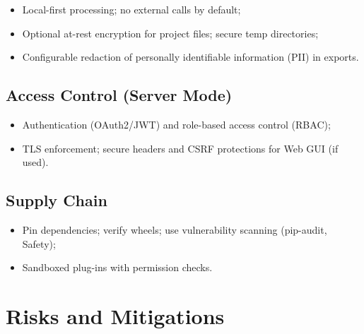 \begin{itemize}
    \item Local-first processing; no external calls by default;
    \item Optional at-rest encryption for project files; secure temp directories;
    \item Configurable redaction of personally identifiable information (PII) in exports.
\end{itemize}

\subsection{Access Control (Server Mode)}

\begin{itemize}
    \item Authentication (OAuth2/JWT) and role-based access control (RBAC);
    \item TLS enforcement; secure headers and CSRF protections for Web GUI (if used).
\end{itemize}

\subsection{Supply Chain}

\begin{itemize}
    \item Pin dependencies; verify wheels; use vulnerability scanning (pip-audit, Safety);
    \item Sandboxed plug-ins with permission checks.
\end{itemize}

\section{Risks and Mitigations}

